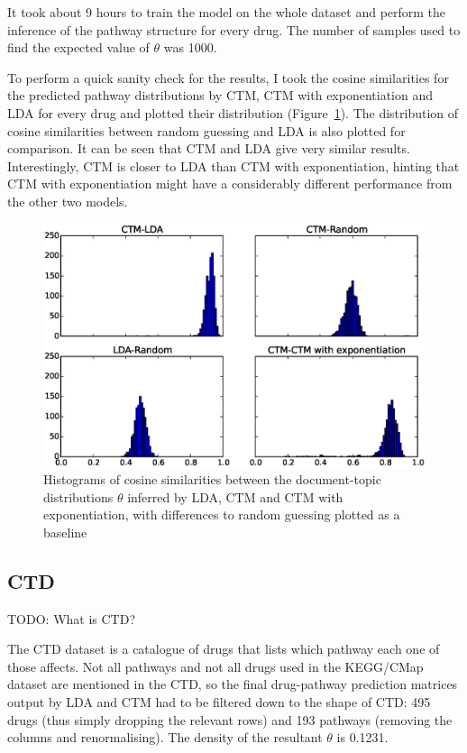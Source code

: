 \documentclass[12pt,a4paper,twoside,openright]{report}
\begin{document}
It took about 9 hours to train the model on the whole dataset and perform the inference of the pathway structure for every drug. The number of samples used to find the expected value of $\theta$ was 1000.

To perform a quick sanity check for the results, I took the cosine similarities for the predicted pathway distributions by CTM, CTM with exponentiation and LDA for every drug and plotted their distribution (Figure~\ref{fig:ctd-ctm-lda-diffs}). The distribution of cosine similarities between random guessing and LDA is also plotted for comparison. It can be seen that CTM and LDA give very similar results. Interestingly, CTM is closer to LDA than CTM with exponentiation, hinting that CTM with exponentiation might have a considerably different performance from the other two models.

\begin{figure}[!htb]
\includegraphics[width=\textwidth]{ctd-ctm-lda-diffs.eps}
\caption{Histograms of cosine similarities between the document-topic distributions $\theta$ inferred by LDA, CTM and CTM with exponentiation, with differences to random guessing plotted as a baseline}
\label{fig:ctd-ctm-lda-diffs}
\end{figure}

\subsection{CTD}

TODO: What is CTD?

The CTD dataset is a catalogue of drugs that lists which pathway each one of those affects. Not all pathways and not all drugs used in the KEGG/CMap dataset are mentioned in the CTD, so the final drug-pathway prediction matrices output by LDA and CTM had to be filtered down to the shape of CTD: 495 drugs (thus simply dropping the relevant rows) and 193 pathways (removing the columns and renormalising). The density of the resultant $\theta$ is 0.1231.
\end{document}
